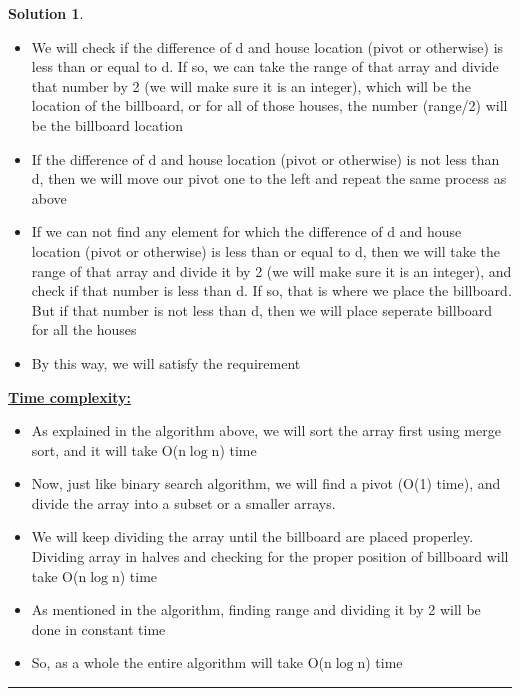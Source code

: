 \documentclass{article}
\theoremstyle{definition}
\def\fline{\rule{0.75\linewidth}{0.5pt}}
\newcommand{\finishline}{\vspace{-15pt}\begin{center}\fline\end{center}}
\newtheorem*{solution*}{Solution}
\newenvironment{solution}{\begin{solution*}}{{\finishline} \end{solution*}}
\begin{document}
\begin{solution}
\begin{itemize}
			\item We will check if the difference of d and house location (pivot or otherwise) is less than or equal to d. If so, we can take the range of that array and divide that number by 2 (we will make sure it is an integer), which will be the location of the billboard, or for all of those houses, the number (range/2) will be the billboard location
			\item If the difference of d and house location (pivot or otherwise) is not less than d, then we will move our pivot one to the left and repeat the same process as above
			\item If we can not find any element for which the difference of d and house location (pivot or otherwise) is less than or equal to d, then we will take the range of that array and divide it by 2 (we will make sure it is an integer), and check if that number is less than d. If so, that is where we place the billboard. But if that number is not less than d, then we will place seperate billboard for all the houses
			\item By this way, we will satisfy the requirement
		\end{itemize} 
		\textbf{\underline{Time complexity:}}
		\begin{itemize}
			\item As explained in the algorithm above, we will sort the array first using merge sort, and it will take O(n$\log$n) time
			\item Now, just like binary search algorithm, we will find a pivot (O(1) time), and divide the array into a subset or a smaller arrays. 
			\item We will keep dividing the array until the billboard are placed properley. Dividing array in halves and checking for the proper position of billboard will take O(n$\log$n) time
			\item As mentioned in the algorithm, finding range and dividing it by 2 will be done in constant time
			\item So, as a whole the entire algorithm will take O(n$\log$n) time
		\end{itemize} 
\end{solution}


\smallskip
\end{document}
